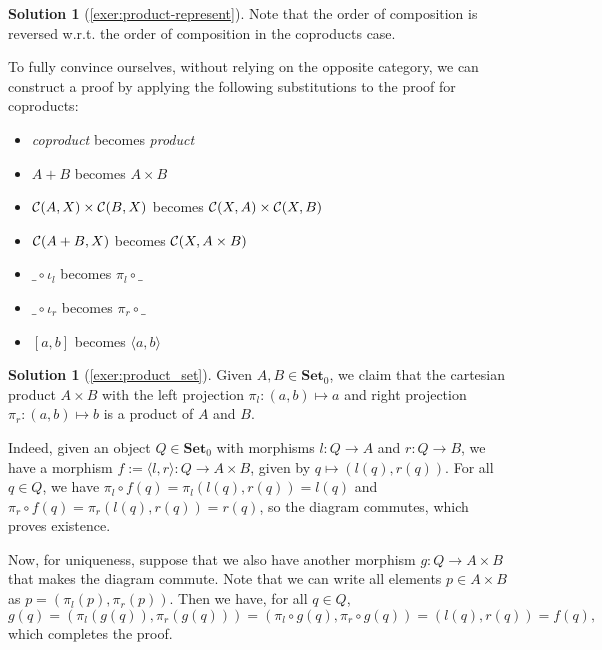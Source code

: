 \documentclass[a4paper,11pt, oneside,titlepage=false]{scrbook}
\theoremstyle{plain}
\theoremstyle{definition}
\newtheorem{solution}[thm]{Solution}
\newcommand{\Catb}[1]{\mathbf{#1}}
\newcommand{\SET}{\Catb{Set}}
\newcommand{\Ob}[1]{{#1}_0}
\newcommand{\inl}{\ensuremath{\iota_l}}
\newcommand{\inr}{\ensuremath{\iota_r}}
\newcommand{\projl}{\ensuremath{\pi_l}}
\newcommand{\projr}{\ensuremath{\pi_r}}
\newcommand{\intoproduct}[2]{\ensuremath{\langle #1, #2 \rangle}}
\newcommand{\outofcoproduct}[2]{\ensuremath{[ #1, #2 ]}}
\newcommand{\co}[2]{\ensuremath{#2 \circ #1}}
\begin{document}
\begin{solution}[\cref{exer:product-represent}]
Note that the order of composition is reversed w.r.t. the order of composition in the coproducts case.

To fully convince ourselves, without relying on the opposite category, we can construct a proof by applying the following substitutions to the proof for coproducts:

\begin{itemize}
	\item \textit{coproduct} becomes \textit{product}
	\item $A+B$ becomes $A\times B$
	\item $\mathcal{C}(A,X)\times\mathcal{C}(B,X)$ becomes $\mathcal{C}(X,A)\times\mathcal{C}(X,B)$
	\item $\mathcal{C}(A+B,X)$ becomes $\mathcal{C}(X,A\times B)$
	\item $\co {\inl} {\_}$ becomes $\co {\_} {\projl}$
	\item $\co {\inr} {\_}$ becomes $\co {\_} {\projr}$
	\item $\outofcoproduct{a}{b}$ becomes $\intoproduct{a}{b}$
\end{itemize}
\end{solution}

\begin{solution}[\cref{exer:product_set}]\label{sol:product_set}
Given $ A, B \in \Ob \SET $, we claim that the cartesian product $ A \times B $ with the left projection $ \projl: (a, b) \mapsto a $ and right projection $ \projr: (a, b) \mapsto b $ is a product of $ A $ and $ B $.

Indeed, given an object $ Q \in \Ob \SET $ with morphisms $ l: Q \to A $ and $ r: Q \to B $, we have a morphism $ f := \langle l, r \rangle : Q \to A \times B $, given by $ q \mapsto (l(q), r(q)) $. For all $ q \in Q $, we have $ \projl \circ f(q) = \projl(l(q), r(q)) = l(q) $ and $ \projr \circ f(q) = \projr(l(q), r(q)) = r(q) $, so the diagram commutes, which proves existence.

Now, for uniqueness, suppose that we also have another morphism $ g: Q \to A \times B $ that makes the diagram commute. Note that we can write all elements $ p \in A \times B $ as $ p = (\projl(p), \projr(p)) $. Then we have, for all $ q \in Q $,
\[ g(q) = (\projl(g(q)), \projr(g(q))) = (\projl \circ g(q), \projr \circ g(q)) = (l(q), r(q)) = f(q), \]
which completes the proof.
\end{solution}
\end{document}
